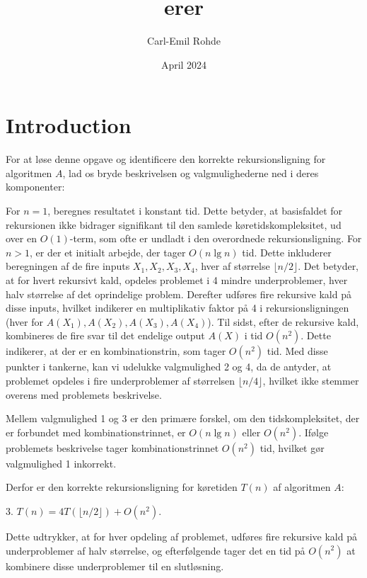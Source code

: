 \documentclass{article}
\title{erer}
\author{Carl-Emil Rohde}
\date{April 2024}
\begin{document}
\maketitle

\section{Introduction}
For at løse denne opgave og identificere den korrekte rekursionsligning for algoritmen $A$, lad os bryde beskrivelsen og valgmulighederne ned i deres komponenter:

For $n=1$, beregnes resultatet i konstant tid. Dette betyder, at basisfaldet for rekursionen ikke bidrager signifikant til den samlede køretidskompleksitet, ud over en $O(1)$-term, som ofte er undladt i den overordnede rekursionsligning.
For $n>1$, er der et initialt arbejde, der tager $O(n \lg n)$ tid. Dette inkluderer beregningen af de fire inputs $X_1, X_2, X_3, X_4$, hver af størrelse $\lfloor n / 2\rfloor$. Det betyder, at for hvert rekursivt kald, opdeles problemet i 4 mindre underproblemer, hver halv størrelse af det oprindelige problem.
Derefter udføres fire rekursive kald på disse inputs, hvilket indikerer en multiplikativ faktor på 4 i rekursionsligningen (hver for $A(X_1), A(X_2), A(X_3), A(X_4)$).
Til sidst, efter de rekursive kald, kombineres de fire svar til det endelige output $A(X)$ i tid $O\left(n^2\right)$. Dette indikerer, at der er en kombinationstrin, som tager $O\left(n^2\right)$ tid.
Med disse punkter i tankerne, kan vi udelukke valgmulighed 2 og 4, da de antyder, at problemet opdeles i fire underproblemer af størrelsen $\lfloor n / 4\rfloor$, hvilket ikke stemmer overens med problemets beskrivelse.

Mellem valgmulighed 1 og 3 er den primære forskel, om den tidskompleksitet, der er forbundet med kombinationstrinnet, er $O(n \lg n)$ eller $O\left(n^2\right)$. Ifølge problemets beskrivelse tager kombinationstrinnet $O\left(n^2\right)$ tid, hvilket gør valgmulighed 1 inkorrekt.

Derfor er den korrekte rekursionsligning for køretiden $T(n)$ af algoritmen $A$:

3. $T(n)=4 T(\lfloor n / 2\rfloor)+O\left(n^2\right)$.

Dette udtrykker, at for hver opdeling af problemet, udføres fire rekursive kald på underproblemer af halv størrelse, og efterfølgende tager det en tid på $O\left(n^2\right)$ at kombinere disse underproblemer til en slutløsning.
\end{document}
